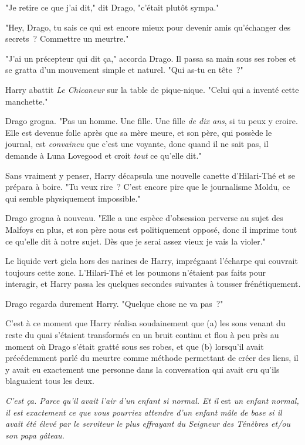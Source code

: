 "Je retire ce que j'ai dit," dit Drago, "c'était plutôt sympa."

"Hey, Drago, tu sais ce qui est encore mieux pour devenir amis qu'échanger des secrets~? Commettre un meurtre."

"J'ai un précepteur qui dit ça," accorda Drago. Il passa sa main sous ses robes et se gratta d'un mouvement simple et naturel. "Qui as-tu en tête~?"

Harry abattit \emph{Le Chicaneur} sur la table de pique-nique. "Celui qui a inventé cette manchette."

Drago grogna. "Pas un homme. Une fille. Une fille \emph{de dix ans}, si tu peux y croire. Elle est devenue folle après que sa mère meure, et son père, qui possède le journal, est \emph{convaincu} que c'est une voyante, donc quand il ne sait pas, il demande à Luna Lovegood et croit \emph{tout} ce qu'elle dit."

Sans vraiment y penser, Harry décapsula une nouvelle canette d'Hilari-Thé et se prépara à boire. "Tu veux rire~? C'est encore pire que le journalisme Moldu, ce qui semble physiquement impossible."

Drago grogna à nouveau. "Elle a une espèce d'obsession perverse au sujet des Malfoys en plus, et son père nous est politiquement opposé, donc il imprime tout ce qu'elle dit à notre sujet. Dès que je serai assez vieux je vais la violer."

Le liquide vert gicla hors des narines de Harry, imprégnant l'écharpe qui couvrait toujours cette zone. L'Hilari-Thé et les poumons n'étaient pas faits pour interagir, et Harry passa les quelques secondes suivantes à tousser frénétiquement.

Drago regarda durement Harry. "Quelque chose ne va pas~?"

C'est à ce moment que Harry réalisa soudainement que (a) les sons venant du reste du quai s'étaient transformés en un bruit continu et flou à peu près au moment où Drago s'était gratté sous ses robes, et que (b) lorsqu'il avait précédemment parlé du meurtre comme méthode permettant de créer des liens, il y avait eu exactement une personne dans la conversation qui avait cru qu'ils blaguaient tous les deux.

\emph{C'est ça. Parce qu'il avait l'air d'un enfant si normal. Et il} est \emph{un enfant normal, il est exactement ce que vous pourriez attendre d'un enfant mâle de base si il avait été élevé par le serviteur le plus effrayant du Seigneur des Ténèbres et/ou son papa gâteau.}

